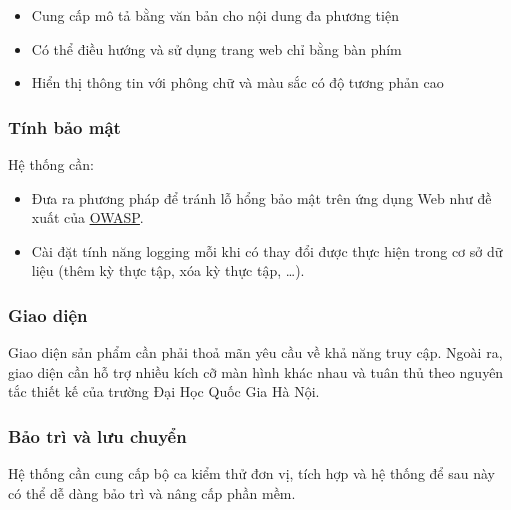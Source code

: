 \documentclass[./../main.tex]{subfiles}
\begin{document}
\begin{itemize}
	\item
	      
	      	Cung cấp mô tả bằng văn bản cho nội dung đa phương tiện
	      
	\item
	      
	      	Có thể điều hướng và sử dụng trang web chỉ bằng bàn phím
	      
	\item
	      
	      	Hiển thị thông tin với phông chữ và màu sắc có độ tương phản cao
	      
\end{itemize}

\hypertarget{tuxednh-bux1ea3o-mux1eadt}{%
	\subsubsection{Tính bảo mật}\label{tuxednh-bux1ea3o-mux1eadt}}

Hệ thống cần:

\begin{itemize}
	\item
	      
	      	Đưa ra phương pháp để tránh lỗ hổng bảo mật trên ứng dụng Web như đề
	      	xuất của
	      	\href{https://owasp.org/www-project-top-ten/}{\underline{OWASP}}.
	      
	\item
	      
	      	Cài đặt tính năng logging mỗi khi có thay đổi được thực hiện trong cơ
	      	sở dữ liệu (thêm kỳ thực tập, xóa kỳ thực tập, \ldots).
	      
\end{itemize}

\hypertarget{giao-diux1ec7n}{%
	\subsubsection{Giao diện}\label{giao-diux1ec7n}}

Giao diện sản phẩm cần phải thoả mãn yêu cầu về khả năng truy cập. Ngoài
ra, giao diện cần hỗ trợ nhiều kích cỡ màn hình khác nhau và tuân thủ
theo nguyên tắc thiết kế của trường Đại Học Quốc Gia Hà Nội.

\hypertarget{bux1ea3o-truxec-vuxe0-lux1b0u-chuyux1ec3n}{%
	\subsubsection{Bảo trì và lưu
		chuyển}\label{bux1ea3o-truxec-vuxe0-lux1b0u-chuyux1ec3n}}

Hệ thống cần cung cấp bộ ca kiểm thử đơn vị, tích hợp và hệ thống để sau
này có thể dễ dàng bảo trì và nâng cấp phần mềm.
\end{document}
